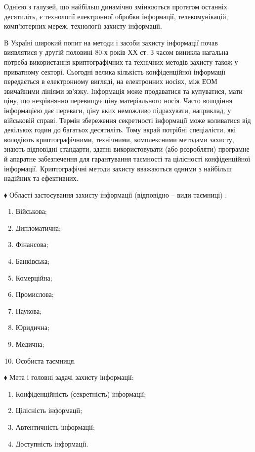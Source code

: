 \documentclass[a4paper]{article}
\newcommand\liststyleWWviiiNumvii{%
\renewcommand\theenumi{\arabic{enumi}}
\renewcommand\theenumii{\arabic{enumii}}
\renewcommand\theenumiii{\arabic{enumiii}}
\renewcommand\theenumiv{\arabic{enumiv}}
\renewcommand\labelenumi{\theenumi.}
\renewcommand\labelenumii{\theenumii.}
\renewcommand\labelenumiii{\theenumiii.}
\renewcommand\labelenumiv{\theenumiv.}
}
\newcommand\liststyleWWviiiNumxxviii{%
\renewcommand\theenumi{\arabic{enumi}}
\renewcommand\theenumii{\arabic{enumii}}
\renewcommand\theenumiii{\arabic{enumiii}}
\renewcommand\theenumiv{\arabic{enumiv}}
\renewcommand\labelenumi{\theenumi.}
\renewcommand\labelenumii{\theenumii.}
\renewcommand\labelenumiii{\theenumiii.}
\renewcommand\labelenumiv{\theenumiv.}
}
\newcounter{}
\begin{document}
Однією з галузей, що  найбільш динамічно  змінюються  протягом останніх
десятиліть, є технології електронної обробки інформації, телекомунікацій,
комп’ютерних мереж, технології захисту інформації.

В Україні широкий попит на методи і засоби захисту інформації почав виявлятися у
другій половині 80-х років ХХ ст. З часом виникла нагальна потреба використання
криптографічних та технічних методів захисту також у приватному секторі.
Сьогодні велика кількість конфіденційної інформації передається в електронному
вигляді, на електронних носіях, між ЕОМ звичайними лініями зв’язку. Інформація
може продаватися та купуватися, мати ціну, що незрівнянно перевищує ціну
матеріального носія. Часто володіння інформацією дає переваги, ціну яких
неможливо підрахувати, наприклад, у військовій справі. Термін збереження
секретності інформації може коливатися від декількох годин до багатьох
десятиліть. Тому вкрай потрібні спеціалісти, які володіють  криптографічними,
технічними, комплексними методами захисту, знають відповідні стандарти, здатні
використовувати (або розробляти) програмне й апаратне забезпечення для
гарантування таємності та цілісності конфіденційної інформації. Криптографічні
методи захисту вважаються одними з найбільш надійних та ефективних. 


\bigskip

${\blacklozenge}$ Області застосування захисту інформації (відповідно – види
таємниці) :

\begin{multicols}{2}
\liststyleWWviiiNumvii
\begin{enumerate}
\item Військова;
\item Дипломатична;
\item Фінансова;
\item Банківська;
\item Комерційна;
\item Промислова;
\item Наукова;
\item Юридична;
\item Медична;
\item Особиста таємниця.
\end{enumerate}
\end{multicols}

\bigskip

${\blacklozenge}$ Мета і головні задачі захисту інформації:

\liststyleWWviiiNumxxviii
\begin{enumerate}
\item Конфіденційність (секретність) інформації;
\item Цілісність інформації;
\item Автентичність інформації;
\item Доступність інформації.
\end{enumerate}
\end{document}
